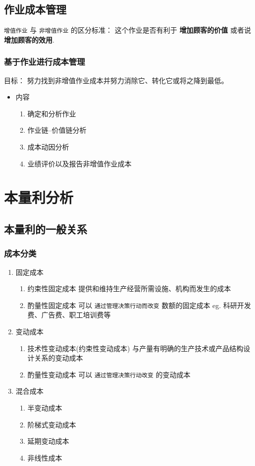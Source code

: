 \documentclass[11pt]{article}
\begin{document}
\subsection{作业成本管理}
\label{sec:orgc758b3c}
\texttt{增值作业} 与 \texttt{非增值作业} 的区分标准： 这个作业是否有利于 \textbf{增加顾客的价值} 或者说 \textbf{增加顾客的效用}.
\subsubsection{基于作业进行成本管理}
\label{sec:org2ed9e63}
目标： 努力找到非增值作业成本并努力消除它、转化它或将之降到最低。
\begin{itemize}
\item 内容
\begin{enumerate}
\item 确定和分析作业
\item 作业链--价值链分析
\item 成本动因分析
\item 业绩评价以及报告非增值作业成本
\end{enumerate}
\end{itemize}
\section{本量利分析}
\label{sec:org68c8967}
\subsection{本量利的一般关系}
\label{sec:orge4a1d9c}
\subsubsection{成本分类}
\label{sec:orgaf5ed70}
\begin{enumerate}
\item 固定成本
\begin{enumerate}
\item 约束性固定成本
提供和维持生产经营所需设施、机构而发生的成本
\item 酌量性固定成本
可以 \texttt{通过管理决策行动而改变} 数额的固定成本
eg. 科研开发费、广告费、职工培训费等
\end{enumerate}
\item 变动成本
\begin{enumerate}
\item 技术性变动成本(约束性变动成本)
与产量有明确的生产技术或产品结构设计关系的变动成本
\item 酌量性变动成本
可以 \texttt{通过管理决策行动改变} 的变动成本
\end{enumerate}
\item 混合成本
\begin{enumerate}
\item 半变动成本
\item 阶梯式变动成本
\item 延期变动成本
\item 非线性成本
\end{enumerate}
\end{enumerate}
\end{document}
